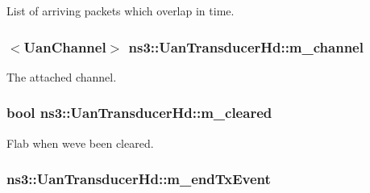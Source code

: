 List of arriving packets which overlap in time. 

\subsubsection[{\texorpdfstring{m\+\_\+channel}{m_channel}}]{$<${\bf Uan\+Channel}$>$ ns3\+::\+Uan\+Transducer\+Hd\+::m\+\_\+channel\hspace{0.3cm}{\ttfamily [private]}}\hypertarget{classns3_1_1UanTransducerHd_a6124f374654fef345db73e26d12c0eb1}{}\label{classns3_1_1UanTransducerHd_a6124f374654fef345db73e26d12c0eb1}


The attached channel. 

\subsubsection[{\texorpdfstring{m\+\_\+cleared}{m_cleared}}]{\setlength{\rightskip}{0pt plus 5cm}bool ns3\+::\+Uan\+Transducer\+Hd\+::m\+\_\+cleared\hspace{0.3cm}{\ttfamily [private]}}\hypertarget{classns3_1_1UanTransducerHd_a54444d90f503964839dc6aea061a4f9e}{}\label{classns3_1_1UanTransducerHd_a54444d90f503964839dc6aea061a4f9e}


Flab when we\textquotesingle{}ve been cleared. 

\subsubsection[{\texorpdfstring{m\+\_\+end\+Tx\+Event}{m_endTxEvent}}]{ ns3\+::\+Uan\+Transducer\+Hd\+::m\+\_\+end\+Tx\+Event\hspace{0.3cm}{\ttfamily [private]}}\hypertarget{classns3_1_1UanTransducerHd_ab7bf49e797bf263994d55f1e59c771c0}{}\label{classns3_1_1UanTransducerHd_ab7bf49e797bf263994d55f1e59c771c0}


